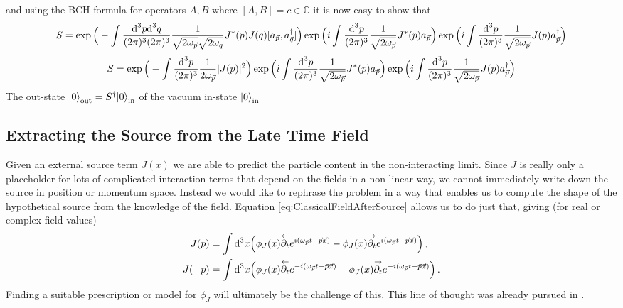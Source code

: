 and using the BCH-formula for operators ${A,B}$ where ${[A,B]=c\in\mathbb{C}}$ it is now easy to show that
\begin{equation}
    S=\exp\Big(-\int\frac{\text{d}^3p\text{d}^3q}{(2\pi)^3(2\pi)^3}\frac{1}{\sqrt{2\omega_{\vec{p}}}\sqrt{2\omega_{\vec{q}}}}J^*(p)J(q)[a_{\vec{p}},a_{\vec{q}}^\dagger]\Big)\exp\Big({i}\int\frac{\text{d} ^3p}{(2\pi)^3}\frac{1}{\sqrt{2\omega_{\vec{p}}}}J^*(p)a_{\vec{p}}\Big)\exp\Big({i}\int\frac{\text{d} ^3p}{(2\pi)^3}\frac{1}{\sqrt{2\omega_{\vec{p}}}}J(p)a_{\vec{p}}^\dagger\Big)
\end{equation}
\begin{equation}
    S=\exp\Big(-\int\frac{\text{d}^3p}{(2\pi)^3}\frac{1}{2\omega_{\vec{p}}}\vert J(p)\vert^2\Big)\exp\Big({i}\int\frac{\text{d} ^3p}{(2\pi)^3}\frac{1}{\sqrt{2\omega_{\vec{p}}}}J^*(p)a_{\vec{p}}\Big)\exp\Big({i}\int\frac{\text{d} ^3p}{(2\pi)^3}\frac{1}{\sqrt{2\omega_{\vec{p}}}}J(p)a_{\vec{p}}^\dagger\Big)
\end{equation}
The out-state ${{\lvert0\rangle}_{\text{out}}=S^\dagger{\lvert0\rangle}_{\text{in}}}$ of the vacuum in-state ${\lvert0\rangle}_{\text{in}}$

\subsection{Extracting the Source from the Late Time Field}

Given an external source term $J(x)$ we are able to predict the particle content in the non-interacting limit. Since $J$ is really only a placeholder for lots of complicated interaction terms that depend on the fields in a non-linear way, we cannot immediately write down the source in position or momentum space. Instead we would like to rephrase the problem in a way that enables us to compute the shape of the hypothetical source from the knowledge of the field. Equation \eqref{eq:ClassicalFieldAfterSource} allows us to do just that, giving (for real or complex field values)
\begin{subequations}
    \begin{align}        
        J(p)&=\int\text{d}^3x\Big(\phi_J(x)\overset{\leftarrow}{\partial_t}e^{{i}(\omega_{\vec{p}}t-\vec{p}\vec{x})}-\phi_J(x)\overset{\rightarrow}{\partial_t}e^{{i}(\omega_{\vec{p}}t-\vec{p}\vec{x})}\Big)\,,\\
        J(-p)&=\int\text{d}^3x\Big(\phi_J(x)\overset{\leftarrow}{\partial_t}e^{-{i}(\omega_{\vec{p}}t-\vec{p}\vec{x})}-\phi_J(x)\overset{\rightarrow}{\partial_t}e^{-{i}(\omega_{\vec{p}}t-\vec{p}\vec{x})}\Big)\,.
    \end{align}
    \label{eq:SourceFieldRelation}
\end{subequations} 
Finding a suitable prescription or model for $\phi_J$ will ultimately be the challenge of this. This line of thought was already pursued in \cite{Amelino-CameliaEtAl_1997}.